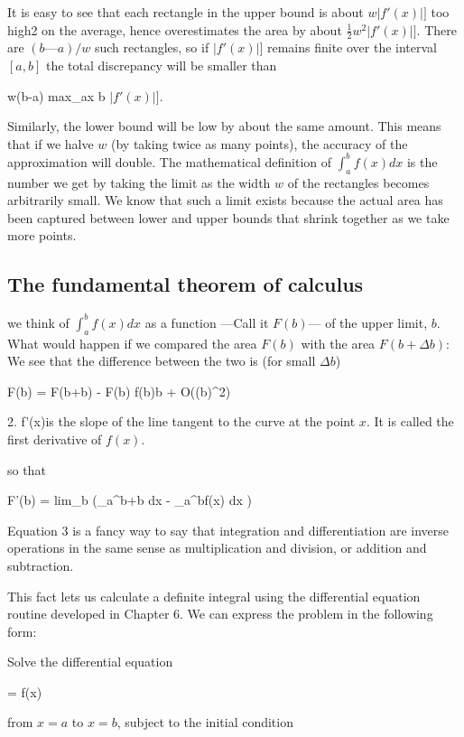 It is easy to see that each rectangle in the upper bound is about $w\lvert f'(x)\rvert]$ too high2 on the average, hence overestimates the area by about $\frac{1}{2}w^2\lvert f'(x)\rvert]$. There are $(b—a)/w$ such rectangles, so if $\lvert f'(x)\rvert]$ remains finite over the interval $[a, b]$ the total discrepancy will be smaller than

w(b-a) max_{a\leq x \leq b} $\lvert f'(x)\rvert]$.

Similarly, the lower bound will be low by about the same amount. This means that if we halve $w$ (by taking twice as many points), the accuracy of the approximation will double. The mathematical definition of $\int_{a}^{b} f(x) dx$ is the number we get by taking the limit as the width $w$ of the rectangles becomes arbitrarily small. We know that such a limit exists because the actual area has been captured between lower and upper bounds that shrink together as we take more points.

\subsection{The fundamental theorem of calculus}
 we think of $\int_{a}^{b}f(x) dx$ as a function —Call it $F(b)$— of the upper limit, $b$. What would happen if we compared the area $F(b)$ with the area $F(b + \Delta b)$: We see that the difference between the two is (for small $\Delta b$)

\Delta F(b) = F(b+\Delta b) - F(b) \approx f(b)\Delta b + O((\Delta b)^2) 

2. f'(x)is the slope of the line tangent to the curve at the point $x$. It is called the first derivative of $f(x)$.

so that

F'(b) = lim_{\Delta b }  (\int_{a}^{b+\Delta b} dx - \int_{a}^{b}f(x) dx )

Equation 3 is a fancy way to say that integration and differentiation are inverse operations in the same sense as multiplication and division, or addition and subtraction.

This fact lets us calculate a definite integral using the differential equation routine developed in Chapter 6. We can express the problem in the following form:

Solve the differential equation

 = f(x)

from $x = a$ to $x = b$, subject to the initial condition

